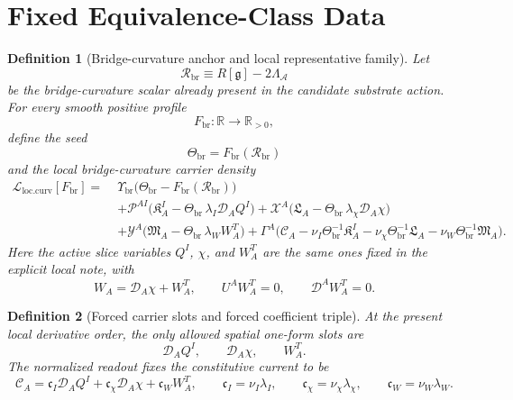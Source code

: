 \documentclass[11pt]{article}
\newcommand{\Sub}{\mathcal{A}}
\newcommand{\BridgeMetric}{\mathfrak g}
\newcommand{\SpatialD}{\mathcal D}
\newcommand{\ConstCurrent}{\mathcal C}
\newcommand{\ConstGamma}{\Gamma}
\newcommand{\CurvQMult}{\mathscr P}
\newcommand{\CurvChiMult}{\mathscr X}
\newcommand{\CurvTransMult}{\mathscr Y}
\newcommand{\CurvSeed}{\Theta_{\mathrm{br}}}
\newcommand{\CurvSeedMult}{\Upsilon_{\mathrm{br}}}
\newcommand{\CurvProfile}{F_{\mathrm{br}}}
\newcommand{\CurvOneI}{\mathfrak K}
\newcommand{\CurvOneChi}{\mathfrak L}
\newcommand{\CurvOneW}{\mathfrak M}
\newcommand{\BridgeCurv}{\mathcal R_{\mathrm{br}}}
\newtheorem{definition}{Definition}
\begin{document}
\section{Fixed Equivalence-Class Data}

\begin{definition}[Bridge-curvature anchor and local representative family]
\label{def:family}
Let
\begin{equation}
\BridgeCurv \equiv R[\BridgeMetric]-2\Lambda_{\Sub}
\label{eq:anchor}
\end{equation}
be the bridge-curvature scalar already present in the candidate substrate action. For every smooth positive profile
\begin{equation}
\CurvProfile:\mathbb R\to \mathbb R_{>0},
\label{eq:fpositive}
\end{equation}
define the seed
\begin{equation}
\CurvSeed=\CurvProfile(\BridgeCurv)
\label{eq:seed}
\end{equation}
and the local bridge-curvature carrier density
\begin{align}
\mathcal L_{\mathrm{loc.curv}}[\CurvProfile]
=\;&
\CurvSeedMult\bigl(\CurvSeed-\CurvProfile(\BridgeCurv)\bigr)
\nonumber\\
&+\CurvQMult^{AI}\bigl(\CurvOneI_A^I-\CurvSeed\,\lambda_I\SpatialD_AQ^I\bigr)
+\CurvChiMult^A\bigl(\CurvOneChi_A-\CurvSeed\,\lambda_\chi\SpatialD_A\chi\bigr)
\nonumber\\
&+\CurvTransMult^A\bigl(\CurvOneW_A-\CurvSeed\,\lambda_WW_A^T\bigr)
+\ConstGamma^A\bigl(
\ConstCurrent_A
-\nu_I\CurvSeed^{-1}\CurvOneI_A^I
-\nu_\chi\CurvSeed^{-1}\CurvOneChi_A
-\nu_W\CurvSeed^{-1}\CurvOneW_A
\bigr).
\label{eq:locfamily}
\end{align}
Here the active slice variables \(Q^I\), \(\chi\), and \(W_A^T\) are the same ones fixed in the explicit local note, with
\begin{equation}
W_A=\SpatialD_A\chi+W_A^T,
\qquad
U^AW_A^T=0,
\qquad
\SpatialD^AW_A^T=0.
\label{eq:Wdecomp}
\end{equation}
\end{definition}

\begin{definition}[Forced carrier slots and forced coefficient triple]
\label{def:forced}
At the present local derivative order, the only allowed spatial one-form slots are
\begin{equation}
\SpatialD_AQ^I,
\qquad
\SpatialD_A\chi,
\qquad
W_A^T.
\label{eq:slots}
\end{equation}
The normalized readout fixes the constitutive current to be
\begin{equation}
\ConstCurrent_A
=
\mathfrak c_I\SpatialD_AQ^I
+\mathfrak c_\chi\SpatialD_A\chi
+\mathfrak c_WW_A^T,
\qquad
\mathfrak c_I=\nu_I\lambda_I,
\qquad
\mathfrak c_\chi=\nu_\chi\lambda_\chi,
\qquad
\mathfrak c_W=\nu_W\lambda_W.
\label{eq:forcedcurrent}
\end{equation}
\end{definition}
\end{document}
